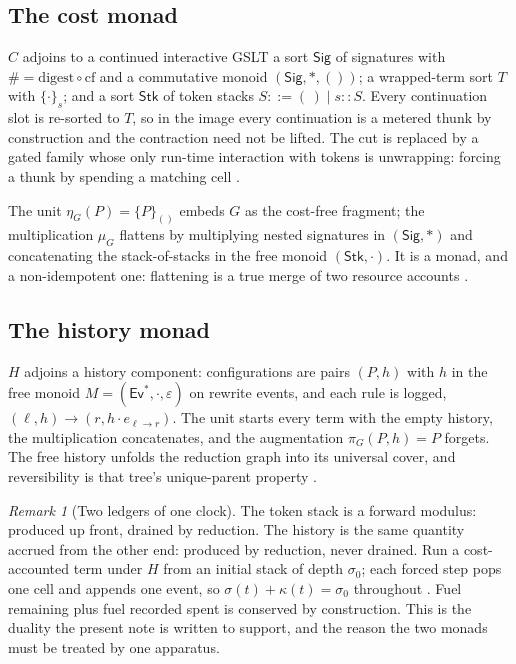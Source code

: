 \documentclass[11pt,a4paper]{article}
\theoremstyle{definition}
\theoremstyle{plain}
\theoremstyle{remark}
\newtheorem{remark}[definition]{Remark}
\newcommand{\Sig}{\mathsf{Sig}}
\newcommand{\Stk}{\mathsf{Stk}}
\newcommand{\Ev}{\mathsf{Ev}}
\begin{document}
\subsection{The cost monad}

$C$ adjoins to a continued interactive GSLT a sort $\Sig$ of signatures with
$\# = \mathrm{digest} \circ \mathrm{cf}$ and a commutative monoid $(\Sig, *, ())$; a wrapped-term
sort $T$ with $\{\cdot\}_s$; and a sort $\Stk$ of token stacks $S ::= (\,) \mid s :: S$. Every
continuation slot is re-sorted to $T$, so in the image every continuation is a metered thunk by
construction and the contraction need not be lifted. The cut is replaced by a gated family whose
only run-time interaction with tokens is unwrapping: forcing a thunk by spending a matching cell
\cite[\S3]{cost}.

The unit $\eta_G(P) = \{P\}_{()}$ embeds $G$ as the cost-free fragment; the multiplication
$\mu_G$ flattens by multiplying nested signatures in $(\Sig,*)$ and concatenating the
stack-of-stacks in the free monoid $(\Stk, \cdot)$. It is a monad, and a non-idempotent one:
flattening is a true merge of two resource accounts \cite[Rmk.~9.3]{cost}.

\subsection{The history monad}

$H$ adjoins a history component: configurations are pairs $(P,h)$ with $h$ in the free monoid
$M = (\Ev^*, \cdot, \varepsilon)$ on rewrite events, and each rule is logged,
$(\ell, h) \to (r, h \cdot e_{\ell \to r})$. The unit starts every term with the empty history, the
multiplication concatenates, and the augmentation $\pi_G(P,h) = P$ forgets. The free history
unfolds the reduction graph into its universal cover, and reversibility is that tree's unique-parent
property \cite[\S3]{history}.

\begin{remark}[Two ledgers of one clock]
\label{rmk:ledger}
The token stack is a forward modulus: produced up front, drained by reduction. The history is the
same quantity accrued from the other end: produced by reduction, never drained. Run a cost-accounted
term under $H$ from an initial stack of depth $\sigma_0$; each forced step pops one cell and appends
one event, so $\sigma(t) + \kappa(t) = \sigma_0$ throughout \cite[Prop.~7.1]{history}. Fuel remaining
plus fuel recorded spent is conserved by construction. This is the duality the present note is
written to support, and the reason the two monads must be treated by one apparatus.
\end{remark}
\end{document}
